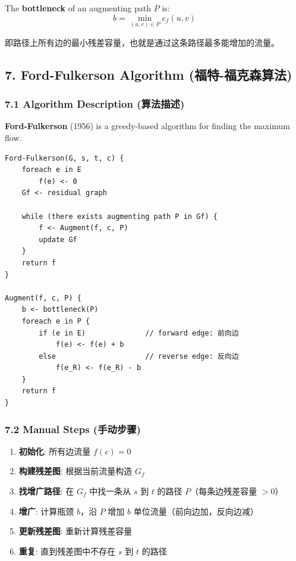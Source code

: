 \documentclass[10pt,a4paper,openany]{ctexbook}
\theoremstyle{definition}
\theoremstyle{remark}
\begin{document}
The \textbf{bottleneck} of an augmenting path $P$ is:
\[
b = \min_{(u,v) \in P} c_f(u, v)
\]

即路径上所有边的最小残差容量，也就是通过这条路径最多能增加的流量。
\vspace{-2pt}

\subsection{7. Ford-Fulkerson Algorithm (福特-福克森算法)}

\subsubsection{7.1 Algorithm Description (算法描述)}

\textbf{Ford-Fulkerson} (1956) is a greedy-based algorithm for finding the maximum flow.
{\footnotesize\begin{verbatim}
Ford-Fulkerson(G, s, t, c) {
    foreach e in E
        f(e) <- 0
    Gf <- residual graph

    while (there exists augmenting path P in Gf) {
        f <- Augment(f, c, P)
        update Gf
    }
    return f
}

Augment(f, c, P) {
    b <- bottleneck(P)
    foreach e in P {
        if (e in E)              // forward edge: 前向边
            f(e) <- f(e) + b
        else                     // reverse edge: 反向边
            f(e_R) <- f(e_R) - b
    }
    return f
}
\end{verbatim}}

\subsubsection{7.2 Manual Steps (手动步骤)}

\begin{enumerate}
\item \textbf{初始化}: 所有边流量 $f(e) = 0$
\item \textbf{构建残差图}: 根据当前流量构造 $G_f$
\item \textbf{找增广路径}: 在 $G_f$ 中找一条从 $s$ 到 $t$ 的路径 $P$（每条边残差容量 $>0$）
\item \textbf{增广}: 计算瓶颈 $b$，沿 $P$ 增加 $b$ 单位流量（前向边加，反向边减）
\item \textbf{更新残差图}: 重新计算残差容量
\item \textbf{重复}: 直到残差图中不存在 $s$ 到 $t$ 的路径

\end{enumerate}
\end{document}
